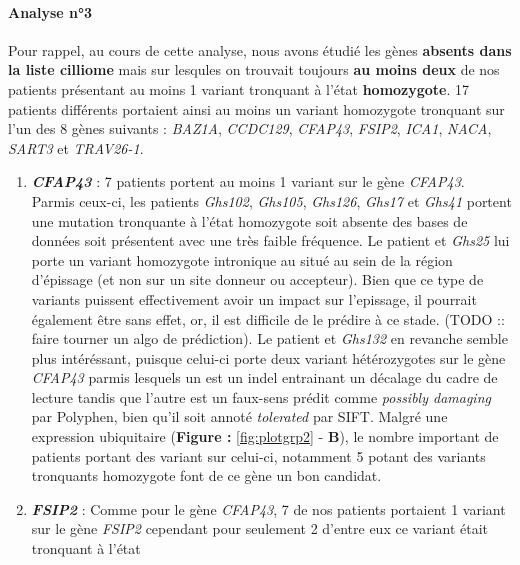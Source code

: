 \documentclass[12pt,twoside]{reedthesis}
\theoremstyle{definition}
\theoremstyle{definition}
\theoremstyle{remark}
\begin{document}
  \newpage
  
  \paragraph{Analyse n°3}\label{analyse-n3}
  
  Pour rappel, au cours de cette analyse, nous avons étudié les gènes
  \textbf{absents dans la liste cilliome} mais sur lesqules on trouvait
  toujours \textbf{au moins deux} de nos patients présentant au moins 1
  variant tronquant à l'état \textbf{homozygote}. 17 patients différents
  portaient ainsi au moins un variant homozygote tronquant sur l'un des 8
  gènes suivants : \emph{BAZ1A}, \emph{CCDC129}, \emph{CFAP43},
  \emph{FSIP2}, \emph{ICA1}, \emph{NACA}, \emph{SART3} et \emph{TRAV26-1}.
  
  \begin{enumerate}
  \def\labelenumi{\arabic{enumi}.}
  \item
    \textbf{\emph{CFAP43}} : 7 patients portent au moins 1 variant sur le
    gène \emph{CFAP43}. Parmis ceux-ci, les patients \emph{Ghs102},
    \emph{Ghs105}, \emph{Ghs126}, \emph{Ghs17} et \emph{Ghs41} portent une
    mutation tronquante à l'état homozygote soit absente des bases de
    données soit présentent avec une très faible fréquence. Le patient et
    \emph{Ghs25} lui porte un variant homozygote intronique au situé au
    sein de la région d'épissage (et non sur un site donneur ou
    accepteur). Bien que ce type de variants puissent effectivement avoir
    un impact sur l'epissage, il pourrait également être sans effet, or,
    il est difficile de le prédire à ce stade. (TODO :: faire tourner un
    algo de prédiction). Le patient et \emph{Ghs132} en revanche semble
    plus intéréssant, puisque celui-ci porte deux variant hétérozygotes
    sur le gène \emph{CFAP43} parmis lesquels un est un indel entrainant
    un décalage du cadre de lecture tandis que l'autre est un faux-sens
    prédit comme \emph{possibly damaging} par Polyphen, bien qu'il soit
    annoté \emph{tolerated} par SIFT. Malgré une expression ubiquitaire
    (\textbf{Figure : }\ref{fig:plotgrp2} - \textbf{B}), le nombre
    important de patients portant des variant sur celui-ci, notamment 5
    potant des variants tronquants homozygote font de ce gène un bon
    candidat.
  \item
    \textbf{\emph{FSIP2}} : Comme pour le gène \emph{CFAP43}, 7 de nos
    patients portaient 1 variant sur le gène \emph{FSIP2} cependant pour
    seulement 2 d'entre eux ce variant était tronquant à l'état

\end{enumerate}
\end{document}
